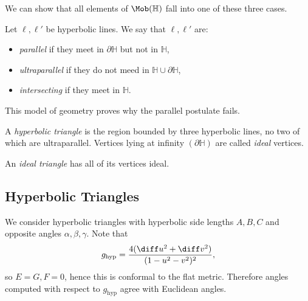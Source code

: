 \documentclass[12pt]{article}
\begin{document}
We can show that all elements of $\Mob(\mathbb{H})$ fall into one of these three cases.

\begin{definition}%
	Let $\ell, \ell'$ be hyperbolic lines. We say that $\ell, \ell'$ are:
	\begin{itemize}
		\item \emph{parallel} if they meet in $\partial \mathbb{H}$ but not in $\mathbb{H}$,
		\item \emph{ultraparallel} if they do not meed in $\mathbb{H} \cup \partial \mathbb{H}$,
		\item \emph{intersecting} if they meet in $\mathbb{H}$.
	\end{itemize}
\end{definition}

This model of geometry proves why the parallel postulate fails.

\begin{definition}
	A \emph{hyperbolic triangle} is the region bounded by three hyperbolic lines, no two of which are ultraparallel. Vertices lying at infinity $(\partial \mathbb{H})$ are called \emph{ideal} vertices.

	An \emph{ideal triangle} has all of its vertices ideal.
\end{definition}


\subsection{Hyperbolic Triangles}
\label{sub:hyperbolic_triangles}

We consider hyperbolic triangles with hyperbolic side lengths $A, B, C$ and opposite angles $\alpha, \beta, \gamma$. Note that
\[
	g_\mathrm{hyp} = \frac{4(\diff u^2 + \diff v^2)}{(1 - u^2 - v^2)^2},
\]
so $E = G, F = 0$, hence this is conformal to the flat metric. Therefore angles computed with respect to $g_\mathrm{hyp}$ agree with Euclidean angles.
\end{document}
